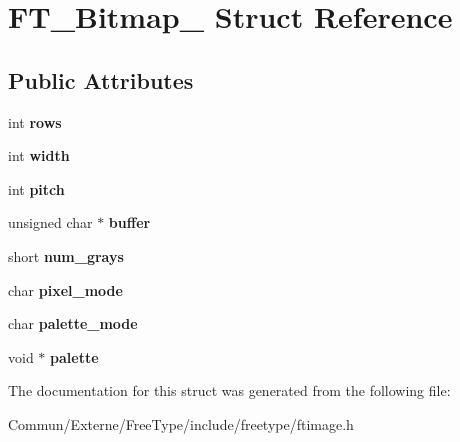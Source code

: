 \hypertarget{struct_f_t___bitmap__}{}\section{F\+T\+\_\+\+Bitmap\+\_\+ Struct Reference}
\label{struct_f_t___bitmap__}
\subsection*{Public Attributes}
\begin{DoxyCompactItemize}
\item 
int {\bfseries rows}\hypertarget{struct_f_t___bitmap___a1b6bb20b30fe087e3fc87a0eb37730c0}{}\label{struct_f_t___bitmap___a1b6bb20b30fe087e3fc87a0eb37730c0}

\item 
int {\bfseries width}\hypertarget{struct_f_t___bitmap___a7b5e6252dd91a3809fe80ebbeb6720eb}{}\label{struct_f_t___bitmap___a7b5e6252dd91a3809fe80ebbeb6720eb}

\item 
int {\bfseries pitch}\hypertarget{struct_f_t___bitmap___afdee595846e1188c7a76d0cec9d85cf2}{}\label{struct_f_t___bitmap___afdee595846e1188c7a76d0cec9d85cf2}

\item 
unsigned char $\ast$ {\bfseries buffer}\hypertarget{struct_f_t___bitmap___a76439b1d3c13b81ca506108cd1623284}{}\label{struct_f_t___bitmap___a76439b1d3c13b81ca506108cd1623284}

\item 
short {\bfseries num\+\_\+grays}\hypertarget{struct_f_t___bitmap___a415d78060f8012d312703c9792ec005a}{}\label{struct_f_t___bitmap___a415d78060f8012d312703c9792ec005a}

\item 
char {\bfseries pixel\+\_\+mode}\hypertarget{struct_f_t___bitmap___a5cc5e0fe42a93a86e16706ad52e087a2}{}\label{struct_f_t___bitmap___a5cc5e0fe42a93a86e16706ad52e087a2}

\item 
char {\bfseries palette\+\_\+mode}\hypertarget{struct_f_t___bitmap___ae7c8c74255cd27873b12a360cd5f3884}{}\label{struct_f_t___bitmap___ae7c8c74255cd27873b12a360cd5f3884}

\item 
void $\ast$ {\bfseries palette}\hypertarget{struct_f_t___bitmap___a8d5ecf4409f71bfb559e0d13d8df4d86}{}\label{struct_f_t___bitmap___a8d5ecf4409f71bfb559e0d13d8df4d86}

\end{DoxyCompactItemize}


The documentation for this struct was generated from the following file\+:\begin{DoxyCompactItemize}
\item 
Commun/\+Externe/\+Free\+Type/include/freetype/ftimage.\+h\end{DoxyCompactItemize}

